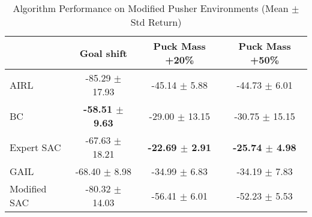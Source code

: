 \documentclass{article}
\begin{document}

\begin{table}
\caption{Algorithm Performance on Modified Pusher Environments (Mean $\pm$ Std Return)}
\label{tab:perf_mod_pusher}
\begin{adjustbox}{max width=\textwidth, center}
\begin{tabular}{lccc}
\toprule
 & Goal shift & Puck Mass +20\% & Puck Mass +50\% \\
\midrule
AIRL & -85.29 $\pm$ 17.93 & -45.14 $\pm$ 5.88 & -44.73 $\pm$ 6.01 \\
BC & \textbf{-58.51 $\pm$ 9.63} & -29.00 $\pm$ 13.15 & -30.75 $\pm$ 15.15 \\
Expert SAC & -67.63 $\pm$ 18.21 & \textbf{-22.69 $\pm$ 2.91} & \textbf{-25.74 $\pm$ 4.98} \\
GAIL & -68.40 $\pm$ 8.98 & -34.99 $\pm$ 6.83 & -34.19 $\pm$ 7.83 \\
Modified SAC & -80.32 $\pm$ 14.03 & -56.41 $\pm$ 6.01 & -52.23 $\pm$ 5.53 \\
\bottomrule
\end{tabular}
\end{adjustbox}
\end{table}
\end{document}
